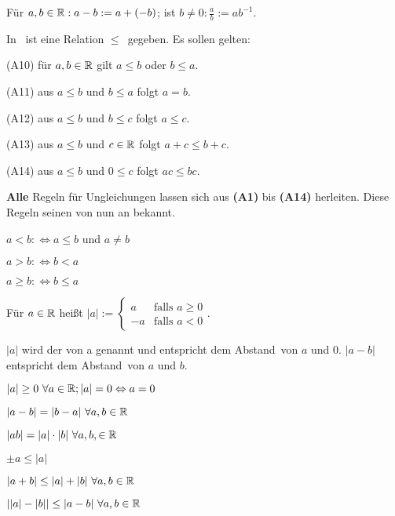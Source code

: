 \documentclass[a4paper,twoside,DIV15,BCOR12mm]{scrbook}
\begin{document}
\begin{schreibweisen}
Für $a,b \in\mathbb{R}: a - b := a+ (-b)$; ist $b \neq 0: \frac{a}{b} := ab^{-1}$.
\end{schreibweisen}

\begin{axiom}[Anordnungsaxiome]
In \MdR\ ist eine Relation \glqq$\le$\grqq\ gegeben. Es sollen gelten:
\begin{liste}
\item[(A10)] für $a,b\in\mathbb{R}$ gilt $a\le b$ oder $b \le a$.
\item[(A11)] aus $a \le b$ und $b \le a $ folgt $a = b$.
\item[(A12)] aus $a \le b$ und $b \le c $ folgt $a \le c$.
\item[(A13)] aus $a \le b$ und $c \in \mathbb{R}$ folgt $a+c \le b+c$.
\item[(A14)] aus $a \le b$ und $0 \le c$ folgt $ac \le bc$.
\end{liste}
\end{axiom}

\textbf{Alle} Regeln für Ungleichungen lassen sich aus \textbf{(A1)} bis \textbf{(A14)} herleiten. Diese Regeln seinen von nun an bekannt.

\begin{schreibweisen}
\begin{liste}
\item $a < b :\Leftrightarrow a \le b $ und $a \ne b$
\item $a > b :\Leftrightarrow b < a$
\item $a \ge b :\Leftrightarrow b \le a$
\end{liste}
\end{schreibweisen}

\begin{definition}[Betrag]
Für $a \in \mathbb{R}$ heißt $ |a| := 
\begin{cases}
 a & \mbox{falls } a \ge 0 \\
-a & \mbox{falls } a < 0
\end{cases} $. 

$|a|$ wird der  von a genannt und entspricht dem \glqq Abstand\grqq\ von $a$ und $0$. $|a-b|$ entspricht dem \glqq Abstand\grqq\ von $a$ und $b$.
\end{definition}

\begin{satz}[Betragssätze]
\begin{liste}
\item $|a| \ge 0 \ \forall a \in \mathbb{R}; |a|= 0 \Leftrightarrow a = 0$
\item $|a-b| = |b-a| \ \forall a,b \in \mathbb{R}$
\item $|ab|  = |a| \cdot |b| \ \forall a,b, \in \mathbb{R}$
\item $\pm a \le |a|$
\item $|a+b| \le |a|+|b| \ \forall a,b \in \mathbb{R}$
\item $||a| - |b|| \le |a - b| \ \forall a,b \in \mathbb{R}$
\end{liste}
\end{satz}
\end{document}
